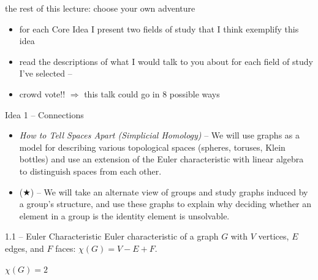 \documentclass{beamer}
\theoremstyle{plain}
\begin{document}
\begin{frame}{the rest of this lecture: choose your own adventure}
 \begin{itemize}
   \item for each Core Idea I present two fields of study that I
     think exemplify this idea
    \pause
   \item read the descriptions of what I would talk to you about for each 
     field of study I've selected
     -- 
    \pause
    \item crowd vote!! \pause $\Rightarrow$ this talk could go in 8 possible ways
 \end{itemize} 
\end{frame}

\begin{frame}{Idea 1 -- Connections}
 \begin{itemize}
   \item \textit{How to Tell Spaces Apart (Simplicial Homology)} --
    We will use graphs as a model for describing various topological spaces
    (spheres, toruses, Klein bottles) and use an extension of the Euler
    characteristic with linear algebra to distinguish spaces from each other. 
  \item ($\bigstar$)  -- We
    will take an alternate view of groups and study graphs induced by a group's
    structure, and use these graphs to explain why deciding whether an element
    in a group is the identity element is unsolvable.  
 \end{itemize} 
\end{frame}

\begin{frame}{1.1 -- Euler Characteristic}
 Euler characteristic of a graph $G$ with $V$ vertices, $E$ edges,
 and $F$ faces: $\chi(G) = V - E + F$.
\begin{center}

    $\chi(G) = 2$
\end{center}
\end{frame}
\end{document}
